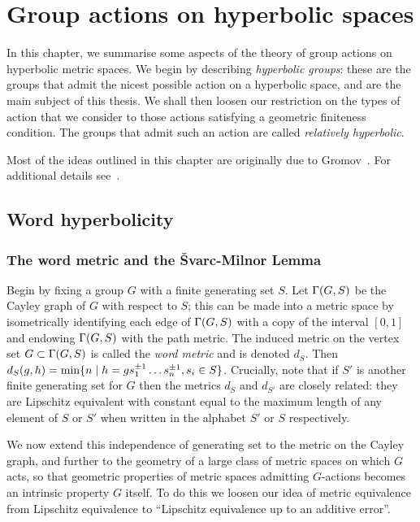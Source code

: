 \chapter{Group actions on hyperbolic spaces}
\label{chapter:hyperbolic_groups}

In this chapter, we summarise some aspects of the theory of group actions on hyperbolic metric spaces.
We begin by describing \emph{hyperbolic groups}: these are the groups that admit the nicest possible action on a hyperbolic space, and are the main subject of this thesis.
We shall then loosen our restriction on the types of action that we consider to those actions satisfying a geometric finiteness condition. 
The groups that admit such an action are called \emph{relatively hyperbolic}.

Most of the ideas outlined in this chapter are originally due to Gromov~\cite{gromov87}.
For additional details see~\cite{coornaertdelzantpapadopoulos90,ghysdelaharpe90,bridsonhaefliger99}.

\section{Word hyperbolicity}

\subsection{The word metric and the \v{S}varc-Milnor Lemma}

Begin by fixing a group $G$ with a finite generating set $S$. 
Let $\operatorname{\Gamma}(G,S)$ be the Cayley graph of $G$ with respect to $S$; this can be made into a metric space by isometrically identifying each edge of $\operatorname{\Gamma}(G,S)$ with a copy of the interval $[0,1]$ and endowing $\operatorname{\Gamma}(G,S)$ with the path metric.
The induced metric on the vertex set $G \subset \operatorname{\Gamma}(G,S)$ is called the \emph{word metric} and is denoted $d_S$.
Then $d_S(g,h) = \min\{n \mid h = gs_1^{\pm 1}\ldots s_n^{\pm 1}, s_i \in S\}$.
Crucially, note that if $S'$ is another finite generating set for $G$ then the metrics $d_S$ and $d_{S'}$ are closely related: they are Lipschitz equivalent with constant equal to the maximum length of any element of $S$ or $S'$ when written in the alphabet $S'$ or $S$ respectively.

We now extend this independence of generating set to the metric on the Cayley graph, and further to the geometry of a large class of metric spaces on which $G$ acts, so that geometric properties of metric spaces admitting $G$-actions becomes an intrinsic property $G$ itself.
To do this we loosen our idea of metric equivalence from Lipschitz equivalence to ``Lipschitz equivalence up to an additive error''.

